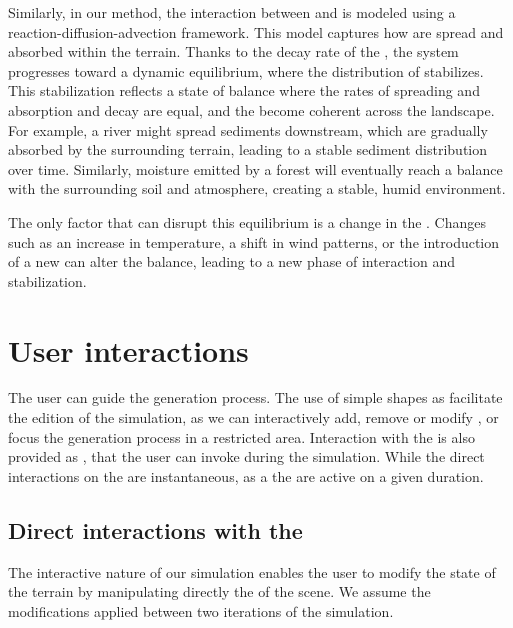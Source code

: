 Similarly, in our method, the interaction between  and  is modeled using a reaction-diffusion-advection framework. This model captures how  are spread and absorbed within the terrain. Thanks to the decay rate of the , the system progresses toward a dynamic equilibrium, where the distribution of  stabilizes. This stabilization reflects a state of balance where the rates of spreading and absorption and decay are equal, and the  become coherent across the landscape. For example, a river might spread sediments downstream, which are gradually absorbed by the surrounding terrain, leading to a stable sediment distribution over time. Similarly, moisture emitted by a forest will eventually reach a balance with the surrounding soil and atmosphere, creating a stable, humid environment.

The only factor that can disrupt this equilibrium is a change in the . Changes such as an increase in temperature, a shift in wind patterns, or the introduction of a new  can alter the balance, leading to a new phase of interaction and stabilization.


\section{User interactions}
\label{sec:semantic-representation_interaction}
The user can guide the generation process. The use of simple shapes as  facilitate the edition of the simulation, as we can interactively add, remove or modify , or focus the generation process in a restricted area. Interaction with the  is also provided as , that the user can invoke during the simulation. While the direct interactions on the  are instantaneous, as a the  are active on a given duration.

\subsection{Direct interactions with the }
\label{sec:semantic-representation_manual-interaction}
The interactive nature of our simulation enables the user to modify the state of the terrain by manipulating directly the  of the scene. We assume the modifications applied between two iterations of the simulation.

